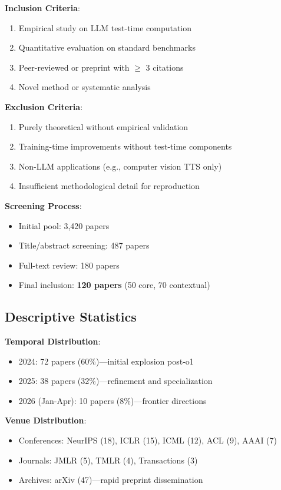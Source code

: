 \documentclass[10pt,preprint]{neurips_2024}
\begin{document}
\textbf{Inclusion Criteria}:
\begin{enumerate}
    \item Empirical study on LLM test-time computation
    \item Quantitative evaluation on standard benchmarks
    \item Peer-reviewed or preprint with $\geq$ 3 citations
    \item Novel method or systematic analysis
\end{enumerate}

\textbf{Exclusion Criteria}:
\begin{enumerate}
    \item Purely theoretical without empirical validation
    \item Training-time improvements without test-time components
    \item Non-LLM applications (e.g., computer vision TTS only)
    \item Insufficient methodological detail for reproduction
\end{enumerate}

\textbf{Screening Process}:
\begin{itemize}
    \item Initial pool: 3,420 papers
    \item Title/abstract screening: 487 papers
    \item Full-text review: 180 papers
    \item Final inclusion: \textbf{120 papers} (50 core, 70 contextual)
\end{itemize}

\subsection{Descriptive Statistics}

\textbf{Temporal Distribution}:
\begin{itemize}
    \item 2024: 72 papers (60\%)---initial explosion post-o1
    \item 2025: 38 papers (32\%)---refinement and specialization
    \item 2026 (Jan-Apr): 10 papers (8\%)---frontier directions
\end{itemize}

\textbf{Venue Distribution}:
\begin{itemize}
    \item Conferences: NeurIPS (18), ICLR (15), ICML (12), ACL (9), AAAI (7)
    \item Journals: JMLR (5), TMLR (4), Transactions (3)
    \item Archives: arXiv (47)---rapid preprint dissemination
\end{itemize}
\end{document}
